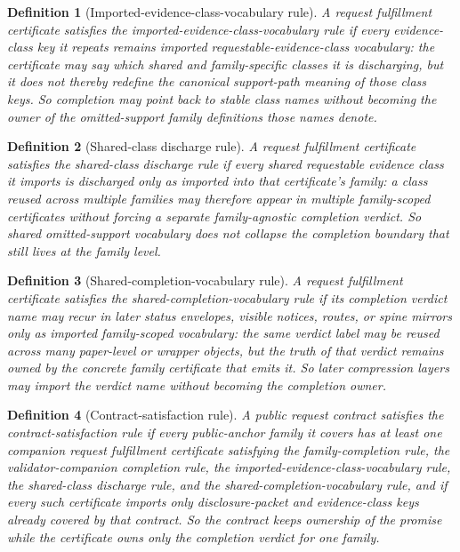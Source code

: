 \documentclass[11pt]{article}
\newtheorem{definition}{Definition}
\begin{document}
\begin{definition}[Imported-evidence-class-vocabulary rule]
A request fulfillment certificate satisfies the \emph{imported-evidence-class-vocabulary rule} if every evidence-class key it repeats remains imported requestable-evidence-class vocabulary: the certificate may say which shared and family-specific classes it is discharging, but it does not thereby redefine the canonical support-path meaning of those class keys.
So completion may point back to stable class names without becoming the owner of the omitted-support family definitions those names denote.
\end{definition}
\begin{definition}[Shared-class discharge rule]
A request fulfillment certificate satisfies the \emph{shared-class discharge rule} if every shared requestable evidence class it imports is discharged only \emph{as imported into that certificate's family}: a class reused across multiple families may therefore appear in multiple family-scoped certificates without forcing a separate family-agnostic completion verdict.
So shared omitted-support vocabulary does not collapse the completion boundary that still lives at the family level.
\end{definition}

\begin{definition}[Shared-completion-vocabulary rule]
A request fulfillment certificate satisfies the \emph{shared-completion-vocabulary rule} if its completion verdict name may recur in later status envelopes, visible notices, routes, or spine mirrors only as imported family-scoped vocabulary: the same verdict label may be reused across many paper-level or wrapper objects, but the truth of that verdict remains owned by the concrete family certificate that emits it.
So later compression layers may import the verdict name without becoming the completion owner.
\end{definition}

\begin{definition}[Contract-satisfaction rule]
A public request contract satisfies the \emph{contract-satisfaction rule} if every public-anchor family it covers has at least one companion request fulfillment certificate satisfying the family-completion rule, the validator-companion completion rule, the imported-evidence-class-vocabulary rule, the shared-class discharge rule, and the shared-completion-vocabulary rule, and if every such certificate imports only disclosure-packet and evidence-class keys already covered by that contract.
So the contract keeps ownership of the promise while the certificate owns only the completion verdict for one family.
\end{definition}
\end{document}
